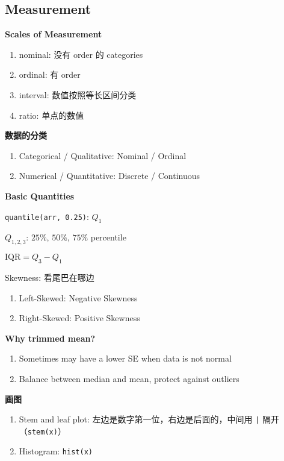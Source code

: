 \documentclass[9pt,landscape]{article}
\begin{document}
\begin{multicols}{3}

\columnseprule=0.25pt

\section{Measurement}

\textbf{Scales of Measurement}

\begin{enumerate}
	\item nominal: 没有 order 的 categories
	\item ordinal: 有 order
	\item interval: 数值按照等长区间分类
	\item ratio: 单点的数值
\end{enumerate}

\textbf{数据的分类}

\begin{enumerate}
	\item Categorical / Qualitative: Nominal / Ordinal
	\item Numerical / Quantitative: Discrete / Continuous
\end{enumerate}

\textbf{Basic Quantities}

\texttt{quantile(arr, 0.25)}: $Q_1$

$Q_{1, 2, 3}$: $25\%$, $50\%$, $75\%$ percentile

$\mathrm{IQR}=Q_3-Q_1$

Skewness: 看尾巴在哪边
\begin{enumerate}
	\item Left-Skewed: Negative Skewness
	\item Right-Skewed: Positive Skewness
\end{enumerate}

\textbf{Why trimmed mean?}

\begin{enumerate}
	\item Sometimes may have a lower SE when data is not normal
	\item Balance between median and mean, protect against outliers
\end{enumerate}

\textbf{画图}

\begin{enumerate}
	\item Stem and leaf plot: 左边是数字第一位，右边是后面的，中间用 \texttt{|} 隔开（\texttt{stem(x)}）
	\item Histogram: \texttt{hist(x)}
\end{enumerate}


\end{multicols}
\end{document}
